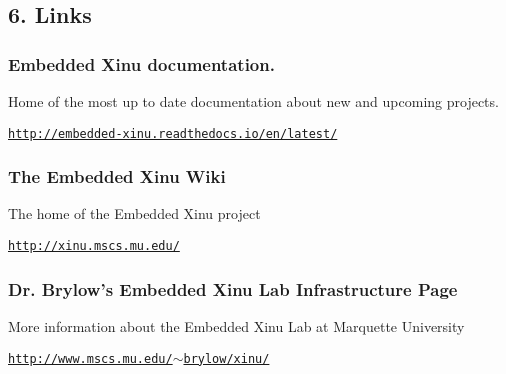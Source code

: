 \subsection*{6. Links}

\subsubsection*{Embedded Xinu documentation.}

Home of the most up to date documentation about new and upcoming projects.

\href{http://embedded-xinu.readthedocs.io/en/latest/}{\tt http\-://embedded-\/xinu.\-readthedocs.\-io/en/latest/}

\subsubsection*{The Embedded Xinu Wiki}

The home of the Embedded Xinu project

\href{http://xinu.mscs.mu.edu/}{\tt http\-://xinu.\-mscs.\-mu.\-edu/}

\subsubsection*{Dr. Brylow's Embedded Xinu Lab Infrastructure Page}

More information about the Embedded Xinu Lab at Marquette University

\href{http://www.mscs.mu.edu/~brylow/xinu/}{\tt http\-://www.\-mscs.\-mu.\-edu/$\sim$brylow/xinu/} 